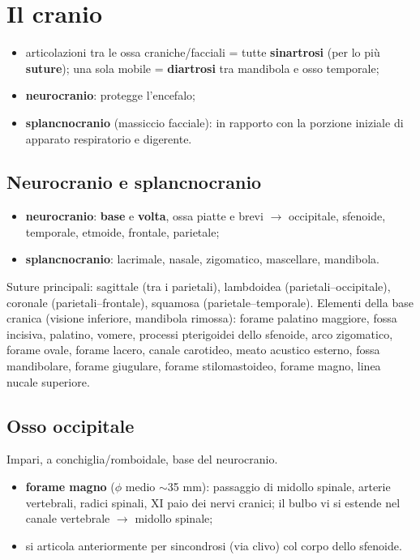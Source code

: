 \section{Il cranio}

\begin{itemize}
  \item articolazioni tra le ossa craniche/facciali = tutte \textbf{sinartrosi} (per lo più
    \textbf{suture}); una sola mobile = \textbf{diartrosi} tra mandibola e osso temporale;
  \item \textbf{neurocranio}: protegge l'encefalo;
  \item \textbf{splancnocranio} (massiccio facciale): in rapporto con la porzione iniziale di
    apparato respiratorio e digerente.
\end{itemize}

\subsection{Neurocranio e splancnocranio}
\begin{itemize}
  \item \textbf{neurocranio}: \textbf{base} e \textbf{volta}, ossa piatte e brevi $\rightarrow$
    occipitale, sfenoide, temporale, etmoide, frontale, parietale;
  \item \textbf{splancnocranio}: lacrimale, nasale, zigomatico, mascellare, mandibola.
\end{itemize}
Suture principali: sagittale (tra i parietali), lambdoidea (parietali--occipitale), coronale
(parietali--frontale), squamosa (parietale--temporale). Elementi della base cranica (visione
inferiore, mandibola rimossa): forame palatino maggiore, fossa incisiva, palatino, vomere, processi
pterigoidei dello sfenoide, arco zigomatico, forame ovale, forame lacero, canale carotideo, meato
acustico esterno, fossa mandibolare, forame giugulare, forame stilomastoideo, forame magno, linea
nucale superiore.

\subsection{Osso occipitale}
Impari, a conchiglia/romboidale, base del neurocranio.
\begin{itemize}
  \item \textbf{forame magno} ($\phi$ medio $\sim$35 mm): passaggio di midollo spinale, arterie
    vertebrali, radici spinali, XI paio dei nervi cranici; il bulbo vi si estende nel canale
    vertebrale $\rightarrow$ midollo spinale;
  \item si articola anteriormente per sincondrosi (via clivo) col corpo dello sfenoide.
\end{itemize}

